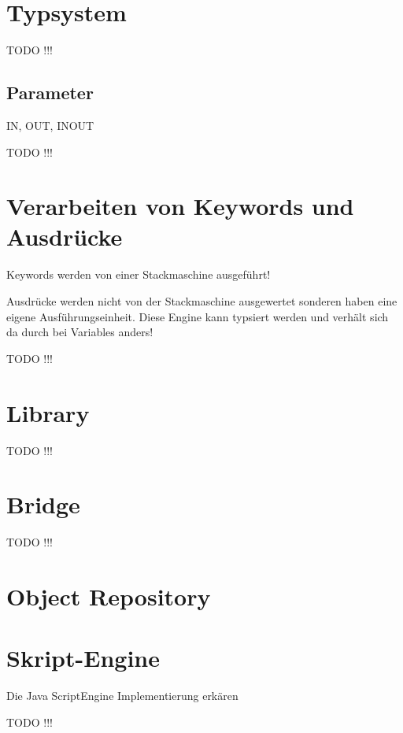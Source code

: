\section{Typsystem}

TODO !!!

\subsection{Parameter}

IN, OUT, INOUT

TODO !!!

\section{Verarbeiten von Keywords und Ausdrücke}

Keywords werden von einer Stackmaschine ausgeführt!

Ausdrücke werden nicht von der Stackmaschine ausgewertet sonderen haben eine eigene Ausführungseinheit. 
Diese Engine kann typsiert werden und verhält sich da durch bei Variables anders!

TODO !!!

\section{Library}

TODO !!!

\section{Bridge}

TODO !!!

\section{Object Repository}


\section{Skript-Engine}

Die Java ScriptEngine Implementierung erkären

TODO !!!